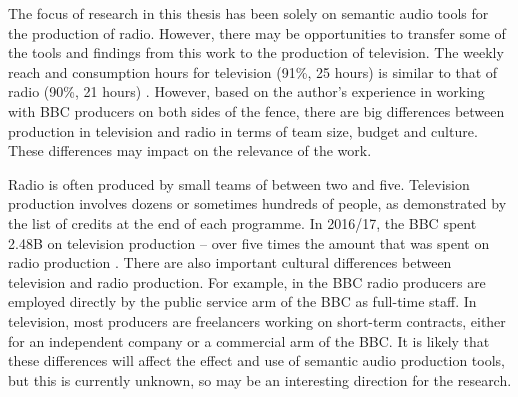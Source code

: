 The focus of research in this thesis has been solely on semantic audio tools for the production of radio. However,
there may be opportunities to transfer some of the tools and findings from this work to the production of television.
The weekly reach and consumption hours for television (91\%, 25 hours) is similar to that of radio (90\%, 21 hours)
\citep[p.  82, 119]{Ofcom2017}.  However, based on the author's experience in working with BBC producers on both sides
of the fence, there are big differences between production in television and radio in terms of team size, budget and
culture. These differences may impact on the relevance of the work.

Radio is often produced by small teams of between two and five. Television production involves dozens or sometimes
hundreds of people, as demonstrated by the list of credits at the end of each programme.  In 2016/17, the BBC spent
\textsterling2.48B on television production -- over five times the amount that was spent on radio production \citep[pp.
39, 111]{Ofcom2017}. There are also important cultural differences between television and radio production. For
example, in the BBC radio producers are employed directly by the public service arm of the BBC as full-time staff. In
television, most producers are freelancers working on short-term contracts, either for an independent company or a
commercial arm of the BBC. It is likely that these differences will affect the effect and use of semantic audio
production tools, but this is currently unknown, so may be an interesting direction for the research.





